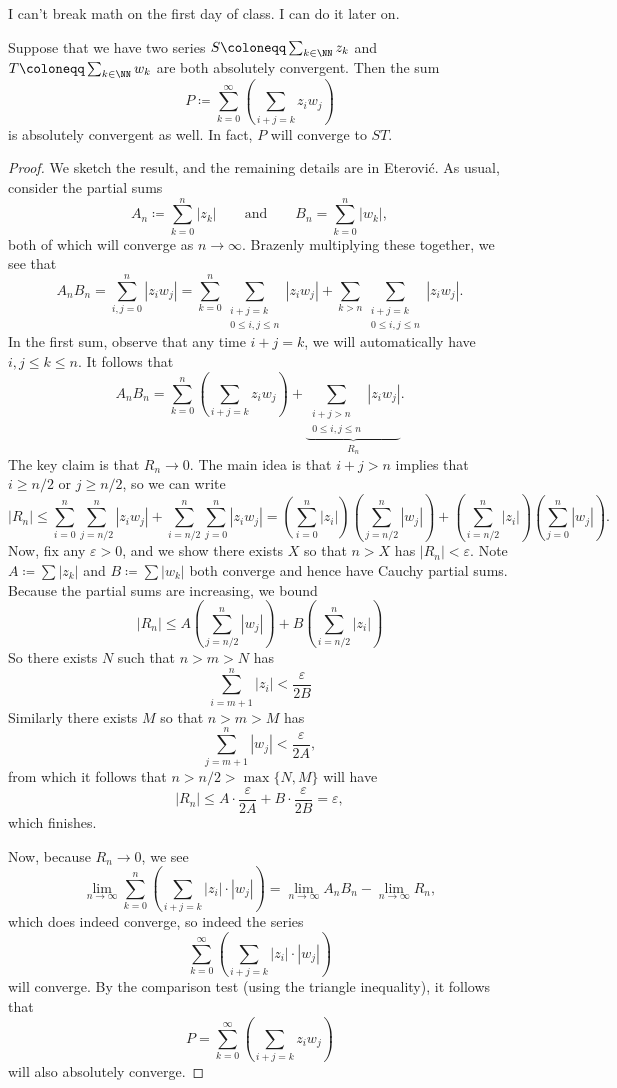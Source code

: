 \documentclass[../notes.tex]{subfiles}
\begin{document}
\begin{quot}
	I can't break math on the first day of class. I can do it later on.
\end{quot}
\begin{lemma}
	Suppose that we have two series $S\coloneqq\sum_{k\in\NN}z_k$ and $T\coloneqq\sum_{k\in\NN}w_k$ are both absolutely convergent. Then the sum
	\[P\coloneqq\sum_{k=0}^\infty\left(\sum_{i+j=k}z_iw_j\right)\]
	is absolutely convergent as well. In fact, $P$ will converge to $ST$.
\end{lemma}
\begin{proof}
	We sketch the result, and the remaining details are in Eterovi\'c. As usual, consider the partial sums
	\[A_n\coloneqq\sum_{k=0}^n|z_k|\qquad\text{and}\qquad B_n=\sum_{k=0}^n|w_k|,\]
	both of which will converge as $n\to\infty$. Brazenly multiplying these together, we see that
	\[A_nB_n=\sum_{i,j=0}^n|z_iw_j|=\sum_{k=0}^n\sum_{\substack{i+j=k\\0\le i,j\le n}}|z_iw_j|+\sum_{k>n}\sum_{\substack{i+j=k\\0\le i,j\le n}}|z_iw_j|.\]
	In the first sum, observe that any time $i+j=k$, we will automatically have $i,j\le k\le n$. It follows that
	\[A_nB_n=\sum_{k=0}^n\left(\sum_{i+j=k}z_iw_j\right)+\underbrace{\sum_{\substack{i+j>n\\0\le i,j\le n}}|z_iw_j|}_{R_n}.\]
	The key claim is that $R_n\to0$. The main idea is that $i+j>n$ implies that $i\ge n/2$ or $j\ge n/2$, so we can write
	\[|R_n|\le\sum_{i=0}^n\sum_{j=n/2}^n|z_iw_j|+\sum_{i=n/2}^n\sum_{j=0}^n|z_iw_j|=\left(\sum_{i=0}^n|z_i|\right)\left(\sum_{j=n/2}^n|w_j|\right)+\left(\sum_{i=n/2}^n|z_i|\right)\left(\sum_{j=0}^n|w_j|\right).\]
	Now, fix any $\varepsilon>0$, and we show there exists $X$ so that $n>X$ has $|R_n|<\varepsilon$. Note $A\coloneqq\sum|z_k|$ and $B\coloneqq\sum|w_k|$ both converge and hence have Cauchy partial sums. Because the partial sums are increasing, we bound
	\[|R_n|\le A\left(\sum_{j=n/2}^n|w_j|\right)+B\left(\sum_{i=n/2}^n|z_i|\right)\]
	So there exists $N$ such that $n>m>N$ has
	\[\sum_{i=m+1}^n|z_i|<\frac\varepsilon {2B}\]
	Similarly there exists $M$ so that $n>m>M$ has
	\[\sum_{j=m+1}^n|w_j|<\frac\varepsilon {2A},\]
	from which it follows that $n>n/2>\max\{N,M\}$ will have
	\[|R_n|\le A\cdot\frac\varepsilon {2A}+B\cdot\frac\varepsilon {2B}=\varepsilon,\]
	which finishes.

	Now, because $R_n\to0$, we see
	\[\lim_{n\to\infty}\sum_{k=0}^n\left(\sum_{i+j=k}|z_i|\cdot|w_j|\right)=\lim_{n\to\infty}A_nB_n-\lim_{n\to\infty}R_n,\]
	which does indeed converge, so indeed the series
	\[\sum_{k=0}^\infty\left(\sum_{i+j=k}|z_i|\cdot|w_j|\right)\]
	will converge. By the comparison test (using the triangle inequality), it follows that
	\[P=\sum_{k=0}^\infty\left(\sum_{i+j=k}z_iw_j\right)\]
	will also absolutely converge.


\end{proof}
\end{document}
